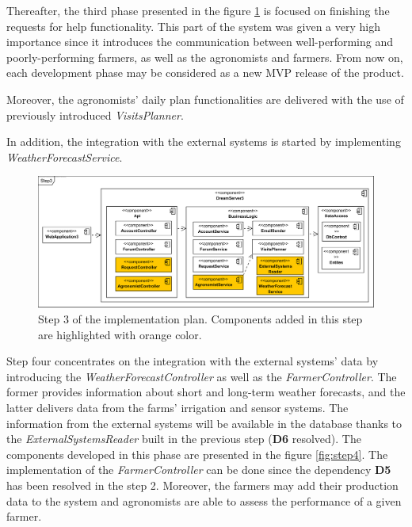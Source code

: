Thereafter, the third phase presented in the figure \ref{fig:step3} is focused on finishing the requests for help functionality. This part of the system was given a very high importance since it introduces the communication between well-performing and poorly-performing farmers, as well as the agronomists and farmers. From now on, each development phase may be considered as a new MVP release of the product.

Moreover, the agronomists' daily plan functionalities are delivered with the use of previously introduced \textit{VisitsPlanner}.

In addition, the integration with the external systems is started by implementing \textit{WeatherForecastService}.

\begin{figure}[H]
    \centering
    \includegraphics[width=\textwidth]
    {diagrams/implementation-plan/Step3.png}
    \caption{Step 3 of the implementation plan. Components added in this step are highlighted with orange color.}
    \label{fig:step3}
\end{figure}

Step four concentrates on the integration with the external systems' data by introducing the \textit{WeatherForecastController} as well as the \textit{FarmerController}. The former provides information about short and long-term weather forecasts, and the latter delivers data from the farms' irrigation and sensor systems. The information from the external systems will be available in the database thanks to the \textit{ExternalSystemsReader} built in the previous step (\textbf{D6} resolved). The components developed in this phase are presented in the figure \ref{fig:step4}. The implementation of the \textit{FarmerController} can be done since the dependency \textbf{D5} has been resolved in the step 2. Moreover, the farmers may add their production data to the system and agronomists are able to assess the performance of a given farmer.

